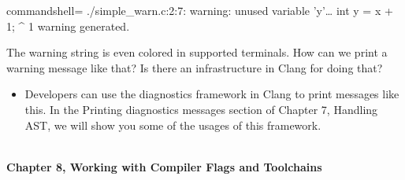 \begin{enumerate}
\begin{tcblisting}{commandshell={}}
./simple_warn.c:2:7: warning: unused variable 'y'…
int y = x + 1;
     ^
1 warning generated.
\end{tcblisting}

The warning string is even colored in supported terminals. How can we print a warning message like that? Is there an infrastructure in Clang for doing that?

\begin{itemize}
\item Developers can use the diagnostics framework in Clang to print messages like this. In the Printing diagnostics messages section of Chapter 7, Handling AST, we will show you some of the usages of this framework.
\end{itemize}

\end{enumerate}

\hspace*{\fill} \\ %
\noindent
\textbf{Chapter 8, Working with Compiler Flags and Toolchains}

